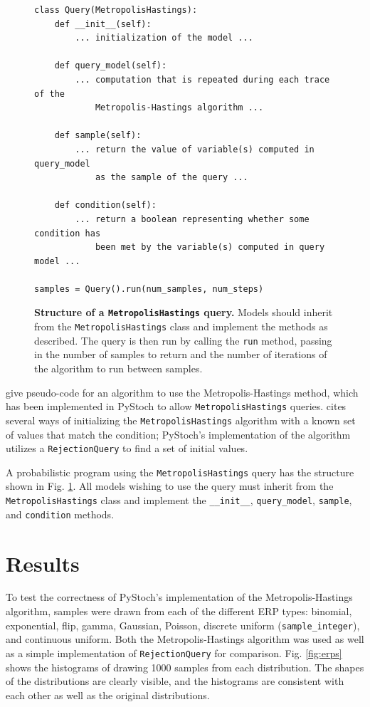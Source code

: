 \documentclass[12pt,letterpaper]{article}
\begin{document}
\begin{figure}
\begin{verbatim}
class Query(MetropolisHastings):
    def __init__(self):
        ... initialization of the model ...

    def query_model(self):
        ... computation that is repeated during each trace of the
            Metropolis-Hastings algorithm ...

    def sample(self):
        ... return the value of variable(s) computed in query_model
            as the sample of the query ...

    def condition(self):
        ... return a boolean representing whether some condition has
            been met by the variable(s) computed in query model ...

samples = Query().run(num_samples, num_steps)
\end{verbatim}
  \caption{\small\textbf{Structure of a \texttt{MetropolisHastings}
      query.}  Models should inherit from the
    \texttt{MetropolisHastings} class and implement the methods as
    described.  The query is then run by calling the \texttt{run}
    method, passing in the number of samples to return and the number
    of iterations of the algorithm to run between samples.}
\label{fig:mh}
\end{figure}

 give pseudo-code for an algorithm to use the
Metropolis-Hastings method, which has been implemented in PyStoch to
allow \texttt{MetropolisHastings} queries.   cites
several ways of initializing the \texttt{MetropolisHastings} algorithm
with a known set of values that match the condition; PyStoch's
implementation of the algorithm utilizes a \texttt{RejectionQuery} to
find a set of initial values.

A probabilistic program using the \texttt{MetropolisHastings} query
has the structure shown in Fig. \ref{fig:mh}.  All models wishing to
use the query must inherit from the \texttt{MetropolisHastings} class
and implement the \texttt{\_\_init\_\_}, \texttt{query\_model},
\texttt{sample}, and \texttt{condition} methods.

\section{Results}

To test the correctness of PyStoch's implementation of the
Metropolis-Hastings algorithm, samples were drawn from each of the
different ERP types: binomial, exponential, flip, gamma, Gaussian,
Poisson, discrete uniform (\texttt{sample\_integer}), and continuous
uniform.  Both the Metropolis-Hastings algorithm was used as well as a
simple implementation of \texttt{RejectionQuery} for comparison.
Fig. \ref{fig:erps} shows the histograms of drawing 1000 samples from
each distribution.  The shapes of the distributions are clearly
visible, and the histograms are consistent with each other as well as
the original distributions.
\end{document}
